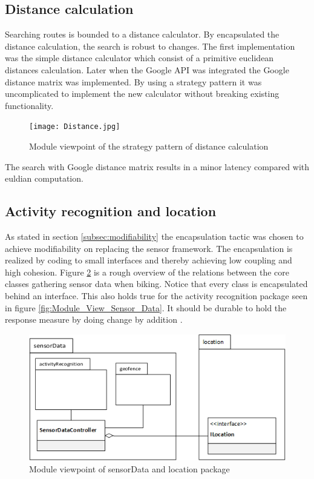 \subsection{Distance calculation}

Searching routes is bounded to a distance calculator. By encapsulated the distance calculation, the search is robust to changes. The first implementation was the simple distance calculator which consist of a primitive euclidean distances calculation. Later when the Google API was integrated the Google distance matrix was implemented. By using a strategy pattern \cite{Baerbak10} it was uncomplicated to implement the new calculator without breaking existing functionality. 

\begin{figure}[H]
\centering
\texttt{[image: Distance.jpg]}
\caption{Module viewpoint of the strategy pattern of distance calculation}
\label{fig:module_view_distance_calculation}
\end{figure}

The search with Google distance matrix results in a minor latency compared with euldian computation.    

\subsection{Activity recognition and location}
\label{section:Activity_recognition_and_location}
As stated in section \ref{subsec:modifiability} the encapsulation tactic was chosen to achieve modifiability on replacing the sensor framework. The encapsulation is realized by coding to small interfaces and thereby achieving low coupling and high cohesion. Figure \ref{fig:activity_regonition_module_viewpoint} is a rough overview of the relations between the core classes gathering sensor data when biking.  
Notice that every class is encapsulated behind an interface. This also holds true for the activity recognition package seen in figure \ref{fig:Module_View_Sensor_Data}. It should be durable to hold the response measure by doing change by addition \cite{Baerbak10}.    

\begin{figure}[H]
\centering
\includegraphics[scale=0.6]{ActivityRegonitionModuleViewpoint.png}
\caption{Module viewpoint of sensorData and location package}
\label{fig:activity_regonition_module_viewpoint}
\end{figure}

